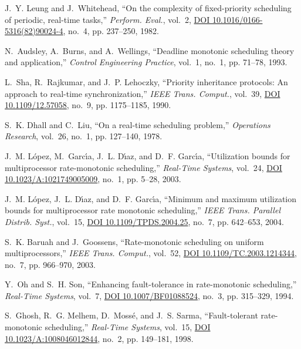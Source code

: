 \documentclass[12pt,onecolumn]{IEEEtranTIE}
\begin{document}
\begin{thebibliography}{10}
J.~Y. Leung and J.~Whitehead, ``On the complexity of fixed-priority scheduling
  of periodic, real-time tasks,'' \emph{Perform. Eval.}, vol.~2,
  \href{http://dx.doi.org/10.1016/0166-5316(82)90024-4}{DOI
  10.1016/0166-5316(82)90024-4}, no.~4, pp. 237--250, 1982.

N.~Audsley, A.~Burns, and A.~Wellings, ``Deadline monotonic scheduling theory
  and application,'' \emph{Control Engineering Practice}, vol.~1, no.~1, pp.
  71--78, 1993.

L.~Sha, R.~Rajkumar, and J.~P. Lehoczky, ``Priority inheritance protocols: An
  approach to real-time synchronization,'' \emph{{IEEE} Trans. Comput.},
  vol.~39, \href{http://dx.doi.org/10.1109/12.57058}{DOI 10.1109/12.57058},
  no.~9, pp. 1175--1185, 1990.

S.~K. Dhall and C.~Liu, ``On a real-time scheduling problem,'' \emph{Operations
  Research}, vol.~26, no.~1, pp. 127--140, 1978.

J.~M. L{\'{o}}pez, M.~Garc{\'{\i}}a, J.~L. D{\'{\i}}az, and D.~F.
  Garc{\'{\i}}a, ``Utilization bounds for multiprocessor rate-monotonic
  scheduling,'' \emph{Real-Time Systems}, vol.~24,
  \href{http://dx.doi.org/10.1023/A:1021749005009}{DOI
  10.1023/A:1021749005009}, no.~1, pp. 5--28, 2003.

J.~M. L{\'{o}}pez, J.~L. D{\'{\i}}az, and D.~F. Garc{\'{\i}}a, ``Minimum and
  maximum utilization bounds for multiprocessor rate monotonic scheduling,''
  \emph{{IEEE} Trans. Parallel Distrib. Syst.}, vol.~15,
  \href{http://dx.doi.org/10.1109/TPDS.2004.25}{DOI 10.1109/TPDS.2004.25},
  no.~7, pp. 642--653, 2004.

S.~K. Baruah and J.~Goossens, ``Rate-monotonic scheduling on uniform
  multiprocessors,'' \emph{{IEEE} Trans. Comput.}, vol.~52,
  \href{http://dx.doi.org/10.1109/TC.2003.1214344}{DOI
  10.1109/TC.2003.1214344}, no.~7, pp. 966--970, 2003.

Y.~Oh and S.~H. Son, ``Enhancing fault-tolerance in rate-monotonic
  scheduling,'' \emph{Real-Time Systems}, vol.~7,
  \href{http://dx.doi.org/10.1007/BF01088524}{DOI 10.1007/BF01088524}, no.~3,
  pp. 315--329, 1994.

S.~Ghosh, R.~G. Melhem, D.~Moss{\'{e}}, and J.~S. Sarma, ``Fault-tolerant
  rate-monotonic scheduling,'' \emph{Real-Time Systems}, vol.~15,
  \href{http://dx.doi.org/10.1023/A:1008046012844}{DOI
  10.1023/A:1008046012844}, no.~2, pp. 149--181, 1998.


\end{thebibliography}
\end{document}
